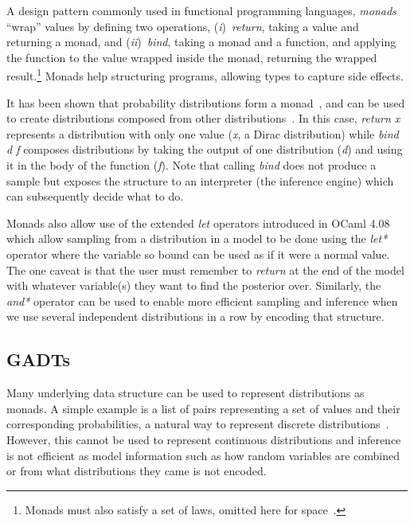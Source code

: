 \documentclass[sigconf]{acmart}
\newcommand{\one}{({\em i})\/}
\newcommand{\two}{({\em ii})\/}
\begin{document}
A design pattern commonly used in functional programming languages, \emph{monads} ``wrap'' values by defining two operations, \one~\emph{return}, taking a value and returning a monad, and \two~\emph{bind}, taking a monad and a function, and applying the function to the value wrapped inside the monad, returning the wrapped result.\footnote{Monads must also satisfy a set of laws, omitted here for space~\cite{wadler1990comprehending}.} Monads help structuring programs, allowing types to capture side effects.

It has been shown that probability distributions form a monad~\cite{giry1982categorical, jones1989probabilistic}, and can be used to create distributions composed from other distributions~\cite{ramsey2002stochastic}. In this case, \emph{return x} represents a distribution with only one value (\emph{x}, a Dirac distribution) while \emph{bind d f} composes distributions by taking the output of one distribution (\emph{d}) and using it in the body of the function (\emph{f}). Note that calling \emph{bind} does not produce a sample but exposes the structure to an interpreter (the inference engine) which can subsequently decide what to do.

Monads also allow use of the extended \emph{let} operators introduced in OCaml 4.08 which allow sampling from a distribution in a model to be done using the \emph{let*} operator where the variable so bound can be used as if it were a normal value. The one caveat is that the user must remember to \emph{return} at the end of the model with whatever variable(s) they want to find the posterior over. Similarly, the \emph{and*} operator can be used to enable more efficient sampling and inference when we use several independent distributions in a row by encoding that structure.

\subsection{GADTs}

Many underlying data structure can be used to represent distributions as monads. A simple example is a list of pairs representing a set of values and their corresponding probabilities, a natural way to represent discrete distributions~\cite{erwig}. However, this cannot be used to represent continuous distributions and inference is not efficient as model information such as how random variables are combined or from what distributions they came is not encoded.
\end{document}
